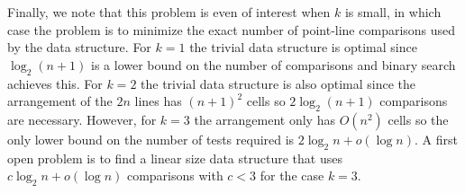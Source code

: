 \documentclass{article}
\begin{document}
Finally, we note that this problem is even of interest when $k$ is
small, in which case the problem is to minimize the exact number of
point-line comparisons used by the data structure.  For $k=1$ the
trivial data structure is optimal since $\log_2 (n+1)$ is a lower
bound on the number of comparisons and binary search achieves this.
For $k=2$ the trivial data structure is also optimal since the
arrangement of the $2n$ lines has $(n+1)^2$ cells so $2\log_2 (n+1)$
comparisons are necessary.  However, for $k=3$ the arrangement only
has $O(n^2)$ cells so the only lower bound on the number of tests
required is $2\log_2 n + o(\log n)$.  A first open problem is to find
a linear size data structure that uses $c\log_2 n + o(\log n)$
comparisons with $c<3$ for the case $k=3$. 



\end{document}
